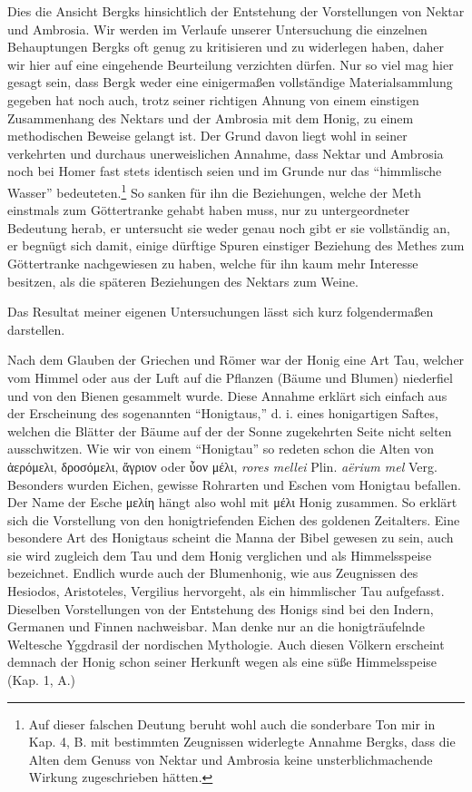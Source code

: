 \documentclass[a4paper, 11pt, oneside]{article}
\begin{document}
Dies die Ansicht Bergks hinsichtlich der Entstehung der Vorstellungen von Nektar und Ambrosia. Wir werden im Verlaufe unserer Untersuchung die einzelnen Behauptungen Bergks oft genug zu kritisieren und zu widerlegen haben, daher wir hier auf eine eingehende Beurteilung verzichten dürfen. Nur so viel mag hier gesagt sein, dass Bergk weder eine einigermaßen vollständige Materialsammlung gegeben hat noch auch, trotz seiner richtigen Ahnung von einem einstigen Zusammenhang des Nektars und der Ambrosia mit dem Honig, zu einem methodischen Beweise gelangt ist. Der Grund davon liegt wohl in seiner verkehrten und durchaus unerweislichen Annahme, dass Nektar und Ambrosia noch bei Homer fast stets identisch seien und im Grunde nur das "`himmlische Wasser"' bedeuteten.\footnote{Auf dieser falschen Deutung beruht wohl auch die sonderbare Ton mir in Kap. 4, B. mit bestimmten Zeugnissen widerlegte Annahme Bergks, dass die Alten dem Genuss von Nektar und Ambrosia keine unsterblichmachende Wirkung zugeschrieben hätten.} So sanken für ihn die Beziehungen, welche der Meth einstmals zum Göttertranke gehabt haben muss, nur zu untergeordneter Bedeutung herab, er untersucht sie weder genau noch gibt er sie vollständig an, er begnügt sich damit, einige dürftige Spuren einstiger Beziehung des Methes zum Göttertranke nachgewiesen zu haben, welche für ihn kaum mehr Interesse besitzen, als die späteren Beziehungen des Nektars zum Weine.

Das Resultat meiner eigenen Untersuchungen lässt sich kurz folgendermaßen darstellen.

Nach dem Glauben der Griechen und Römer war der Honig eine Art Tau, welcher vom Himmel oder aus der Luft auf die Pflanzen (Bäume und Blumen) niederfiel und von den Bienen gesammelt wurde. Diese Annahme erklärt sich einfach aus der Erscheinung des sogenannten "`Honigtaus,"' d. i. eines honigartigen Saftes, welchen die Blätter der Bäume auf der der Sonne zugekehrten Seite nicht selten ausschwitzen. Wie wir von einem "`Honigtau"' so redeten schon die Alten von ἀερόμελι, δροσόμελι, ἄγριον oder ὗον μέλι, \emph{rores mellei} Plin. \emph{aërium mel} Verg. Besonders wurden Eichen, gewisse Rohrarten und Eschen vom Honigtau befallen. Der Name der Esche μελίη hängt also wohl mit μέλι Honig zusammen. So erklärt sich die Vorstellung von den honigtriefenden Eichen des goldenen Zeitalters. Eine besondere Art des Honigtaus scheint die Manna der Bibel gewesen zu sein, auch sie wird zugleich dem Tau und dem Honig verglichen und als Himmelsspeise bezeichnet. Endlich wurde auch der Blumenhonig, wie aus Zeugnissen des Hesiodos, Aristoteles, Vergilius hervorgeht, als ein himmlischer Tau aufgefasst. Dieselben Vorstellungen von der Entstehung des Honigs sind bei den Indern, Germanen und Finnen nachweisbar. Man denke nur an die honigträufelnde Weltesche Yggdrasil der nordischen Mythologie. Auch diesen Völkern erscheint demnach der Honig schon seiner Herkunft wegen als eine süße Himmelsspeise (Kap. 1, A.)
\end{document}
